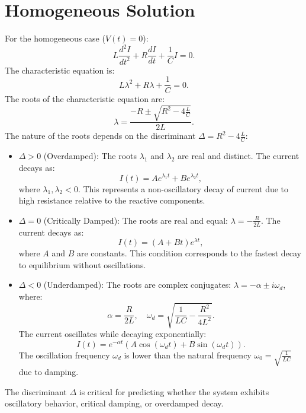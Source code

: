 \documentclass[a4paper,11pt]{article}
\begin{document}
\section*{Homogeneous Solution}
For the homogeneous case (\(V(t) = 0\)):
\[
L \frac{d^2I}{dt^2} + R \frac{dI}{dt} + \frac{1}{C} I = 0.
\]
The characteristic equation is:
\[
L\lambda^2 + R\lambda + \frac{1}{C} = 0.
\]
The roots of the characteristic equation are:
\[
\lambda = \frac{-R \pm \sqrt{R^2 - 4\frac{L}{C}}}{2L}.
\]
The nature of the roots depends on the discriminant \(\Delta = R^2 - 4\frac{L}{C}\):
\begin{itemize}
    \item \(\Delta > 0\) (Overdamped): The roots \(\lambda_1\) and \(\lambda_2\) are real and distinct. The current decays as:
    \[
    I(t) = A e^{\lambda_1 t} + B e^{\lambda_2 t},
    \]
    where \(\lambda_1, \lambda_2 < 0\). This represents a non-oscillatory decay of current due to high resistance relative to the reactive components.
    \item \(\Delta = 0\) (Critically Damped): The roots are real and equal: \(\lambda = -\frac{R}{2L}\). The current decays as:
    \[
    I(t) = (A + Bt)e^{\lambda t},
    \]
    where \(A\) and \(B\) are constants. This condition corresponds to the fastest decay to equilibrium without oscillations.
    \item \(\Delta < 0\) (Underdamped): The roots are complex conjugates: \(\lambda = -\alpha \pm i\omega_d\), where:
    \[
    \alpha = \frac{R}{2L}, \quad \omega_d = \sqrt{\frac{1}{LC} - \frac{R^2}{4L^2}}.
    \]
    The current oscillates while decaying exponentially:
    \[
    I(t) = e^{-\alpha t} \left(A \cos(\omega_d t) + B \sin(\omega_d t)\right).
    \]
    The oscillation frequency \(\omega_d\) is lower than the natural frequency \(\omega_0 = \sqrt{\frac{1}{LC}}\) due to damping.
\end{itemize}
The discriminant \(\Delta\) is critical for predicting whether the system exhibits oscillatory behavior, critical damping, or overdamped decay.
\end{document}
